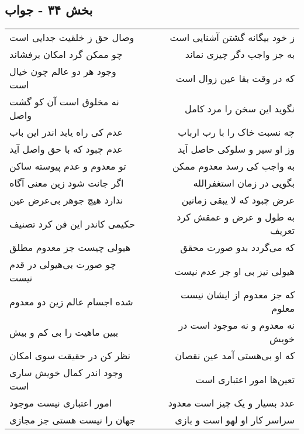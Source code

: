 \begin{center}
\section*{بخش ۳۴ - جواب}
\label{sec:sh034}
\begin{longtable}{l p{0.5cm} r}
وصال حق ز خلقیت جدایی است
&&
ز خود بیگانه گشتن آشنایی است
\\
چو ممکن گرد امکان برفشاند
&&
به جز واجب دگر چیزی نماند
\\
وجود هر دو عالم چون خیال است
&&
که در وقت بقا عین زوال است
\\
نه مخلوق است آن کو گشت واصل
&&
نگوید این سخن را مرد کامل
\\
عدم کی راه یابد اندر این باب
&&
چه نسبت خاک را با رب ارباب
\\
عدم چبود که با حق واصل آید
&&
وز او سیر و سلوکی حاصل آید
\\
تو معدوم و عدم پیوسته ساکن
&&
به واجب کی رسد معدوم ممکن
\\
اگر جانت شود زین معنی آگاه
&&
بگویی در زمان استغفرالله
\\
ندارد هیچ جوهر بی‌عرض عین
&&
عرض چبود که لا یبقی زمانین
\\
حکیمی کاندر این فن کرد تصنیف
&&
به طول و عرض و عمقش کرد تعریف
\\
هیولی چیست جز معدوم مطلق
&&
که می‌گردد بدو صورت محقق
\\
چو صورت بی‌هیولی در قدم نیست
&&
هیولی نیز بی او جز عدم نیست
\\
شده اجسام عالم زین دو معدوم
&&
که جز معدوم از ایشان نیست معلوم
\\
ببین ماهیت را بی کم و بیش
&&
نه معدوم و نه موجود است در خویش
\\
نظر کن در حقیقت سوی امکان
&&
که او بی‌هستی آمد عین نقصان
\\
وجود اندر کمال خویش ساری است
&&
تعین‌ها امور اعتباری است
\\
امور اعتباری نیست موجود
&&
عدد بسیار و یک چیز است معدود
\\
جهان را نیست هستی جز مجازی
&&
سراسر کار او لهو است و بازی
\\
\end{longtable}
\end{center}
